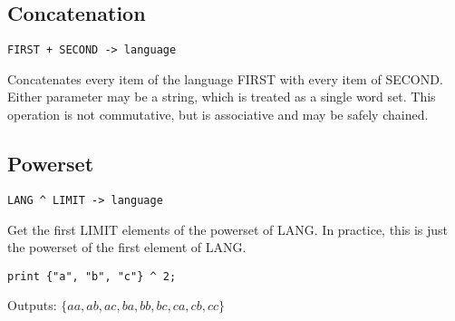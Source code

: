 \subsection{Concatenation }
\begin{center}
\begin{minipage}{5cm}
\begin{verbatim}
FIRST + SECOND -> language
\end{verbatim}
\end{minipage}
\end{center}
\begin{normalsize}
Concatenates every item of the language FIRST with every item of SECOND. Either parameter may be a string, which is treated as a single word set. This operation is not commutative, but is associative and may be safely chained.

\subsection{Powerset}
\begin{center}
\begin{minipage}{5cm}
\begin{verbatim}
LANG ^ LIMIT -> language
\end{verbatim}
\end{minipage}
\end{center}
\begin{normalsize}
Get the first LIMIT elements of the powerset of LANG. In practice, this is just the powerset of the first element of LANG.
\begin{center}
\begin{minipage}{5cm}
\begin{verbatim}
print {"a", "b", "c"} ^ 2;
\end{verbatim}
\end{minipage}
\end{center}
Outputs: $ \{aa, ab, ac, ba, bb, bc, ca, cb, cc\} $
\end{normalsize}
\end{normalsize}

